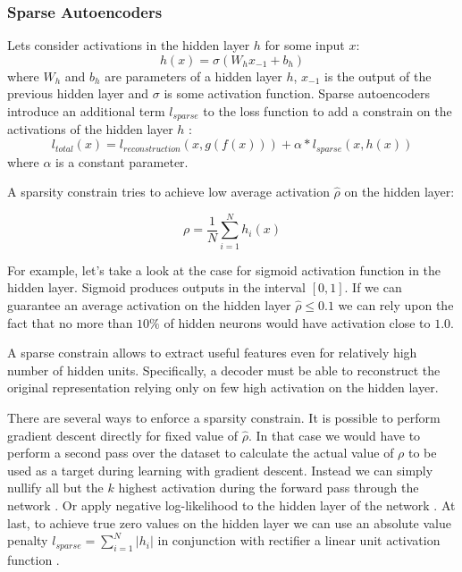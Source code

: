 \subsubsection{Sparse Autoencoders}\label{ch:sae}

Lets consider activations in the hidden layer $h$ for some input $x$:
\begin{equation}
  h(x) = \sigma(W_{h}x_{-1} + b_{h})
\end{equation}
where $W_h$ and $b_h$ are parameters of a hidden layer $h$, $x_{-1}$ is the output of the previous hidden layer and $\sigma$ is some activation function.
Sparse autoencoders introduce an additional term $l_{sparse}$ to the loss function to add a constrain on the activations of the hidden layer $h$ \cite{Ng2011}:
\begin{equation}
  l_{total}(x) = l_{reconstruction}(x, g(f(x))) + \alpha*l_{sparse}(x, h(x))
\end{equation}
where $\alpha$ is a constant parameter.

A sparsity constrain tries to achieve low average activation $\hat{\rho}$ on the hidden layer:

\begin{equation}\label{eq:avgh}
  \rho = \frac{1}{N} \sum_{i=1}^N h_i(x)
\end{equation}

For example, let's take a look at the case for sigmoid activation function in the hidden layer.
Sigmoid produces outputs in the interval $[0, 1]$. If we can guarantee an average activation on the hidden layer $\hat{\rho} \leq 0.1$ we can rely upon the fact that no more than $10\%$ of hidden neurons would have activation close to $1.0$.

A sparse constrain allows to extract useful features even for relatively high number of hidden units. Specifically, a decoder must be able to reconstruct the original representation relying only on few high activation on the hidden layer.

There are several ways to enforce a sparsity constrain.
It is possible to perform gradient descent directly for fixed value of $\hat{\rho}$. In that case we would have to perform a second pass over the dataset to calculate the actual value of $\rho$ to be used as a target during learning with gradient descent. Instead we can simply nullify all but the $k$ highest activation during the forward pass through the network \cite{Kulkarni2015}.
Or apply negative log-likelihood to the hidden layer of the network \cite{Zhao2015}.
At last, to achieve true zero values on the hidden layer we can use an absolute value penalty $l_{sparse}=\sum_{i=1}^N |h_i|$ in conjunction with rectifier a linear unit activation function \cite{Glorot2011}.

